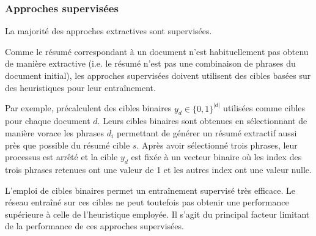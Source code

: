 
\subsubsection*{Approches supervisées}

La majorité des approches extractives sont supervisées.

Comme le résumé correspondant à un document n'est habituellement pas obtenu de
manière extractive (i.e. le résumé n'est pas une combinaison de phrases du document initial),
les approches supervisées doivent utilisent des cibles basées sur des heuristiques pour
leur entraînement.

Par exemple, \citet{10.5555/3298483.3298681} précalculent des cibles binaires $y_d \in \{0,1\}^{|d|}$
utilisées comme cibles pour chaque document $d$.
Leurs cibles binaires sont obtenues en sélectionnant de manière vorace
les phrases $d_i$ permettant de générer un résumé extractif aussi près que possible
du résumé cible $s$.
Après avoir sélectionné trois phrases, leur processus est arrêté et la cible $y_d$
est fixée à un vecteur binaire où les index des trois phrases retenues ont une valeur
de 1 et les autres index ont une valeur nulle.

L'emploi de cibles binaires permet un entraînement supervisé très efficace.
Le réseau entraîné sur ces cibles ne peut toutefois pas obtenir une performance
supérieure à celle de l'heuristique employée.
Il s'agit du principal facteur limitant de la performance de ces approches supervisées.

